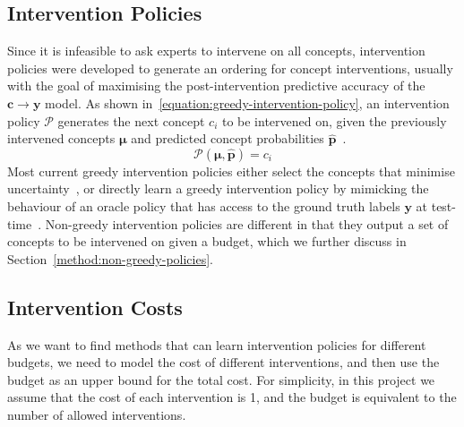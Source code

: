 \subsection{Intervention Policies}
Since it is infeasible to ask experts to intervene on all concepts,
intervention policies were developed to 
generate an ordering for concept interventions,
usually with the goal of maximising the post-intervention 
predictive accuracy of the $\mathbf{c} \to \mathbf{y}$ model. 
As shown in~\ref{equation:greedy-intervention-policy},
an intervention policy $\mathcal{P}$ generates the next concept $c_i$ to be intervened on, given the previously
intervened concepts $\bm{\mu}$ and 
predicted concept probabilities $\hat{\mathbf{p}}$~\cite{ectp, coop, intervention-policies}.
\begin{equation}\label{equation:greedy-intervention-policy}
\mathcal{P}(\bm{\mu}, \hat{\mathbf{p}}) =c_i
\end{equation}
Most current greedy intervention policies
either select the concepts that 
minimise uncertainty~\cite{coop, ectp}, 
or directly learn a greedy 
intervention policy
by mimicking the behaviour of an oracle
policy that has access to the ground truth labels $\mathbf{y}$ at test-time~\cite{behavioural-cloning, intcem}.
Non-greedy intervention policies
are different in that they output a set of concepts to be intervened on given a budget,
which we further discuss in Section~\ref{method:non-greedy-policies}.



\subsection{Intervention Costs}\label{background:intervention-costs}
As we want to find methods that can learn intervention policies for different budgets, we need to model the cost of different interventions, and then use the budget as an upper bound for the total cost. For simplicity, in this project we 
assume that the cost of each intervention is 1, and the budget is equivalent to the number of allowed interventions.

